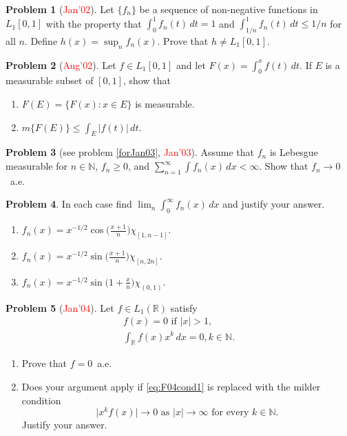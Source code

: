 \documentclass[12pt,reqno]{amsart}
\def\field#1{\mathbb{#1}}
\def\abs#1{\lvert {#1} \rvert}
\def\redc#1{[\textcolor{red}{#1}]}
\theoremstyle{definition}
\newtheorem{problem}{Problem}
\theoremstyle{remark}
\begin{document}
\begin{problem}\redc{Jan'02}
  Let $\{ f_n \}$ be a sequence of non-negative functions in
  $L_1[0,1]$ with the property that $\int_0^1 f_n(t)\, dt = 1$ and
  $\int_{1/n}^1 f_n(t)\, dt \leq 1/n$ for all $n$.  Define $h(x) =
  \sup_n f_n(x)$.  Prove that $ h \neq L_1[0,1]$.
\end{problem}
\begin{problem}\redc{Aug'02}
  Let $f \in L_1[0,1]$ and let $F(x) = \int_0^x f(t)\, dt$.  If $E$ is
  a measurable subset of $[0,1]$, show that
  \begin{enumerate}
  \item $F(E) = \{ F(x) : x \in E\}$ is measurable.
  \item $m\{ F(E) \} \leq \displaystyle{\int_E \abs{f(t)}\, dt}$.
  \end{enumerate}
\end{problem}
\begin{problem}[see problem \ref{forJan03}, \textcolor{red}{Jan'03}]
  Assume that $f_n$ is Lebesgue measurable for $n \in \field{N}$, $f_n
  \geq 0$, and $\sum_{n=1}^\infty \int f_n(x)\, dx < \infty$.  Show
  that $f_n \to 0$~a.e.
\end{problem}
\begin{problem}
  In each case find $\lim_n \int_0^\infty f_n(x)\, dx$ and justify
  your answer.
  \begin{enumerate}
  \item $f_n(x) = x^{-1/2} \cos\big( \frac{x+1}{n} \big)
    \chi_{[1,n-1]}$.
  \item $f_n(x) = x^{-1/2} \sin \big( \frac{x+1}{n} \big)
    \chi_{[n,2n]}$.
  \item $f_n(x) = x^{-1/2} \sin\big( 1 + \frac{x}{n} \big)
    \chi_{(0,1)}$.
  \end{enumerate}
\end{problem}
\begin{problem}\redc{Jan'04}
  Let $f \in L_1(\field{R})$ satisfy
  \begin{gather}
    f(x) = 0 \text{ if } \abs{x} > 1,\label{eq:F04cond1} \\
    \int_{\field{R}} f(x) x^k\, dx = 0, k\in \field{N}.
  \end{gather}
  \begin{enumerate}
  \item Prove that $f=0$~a.e.
  \item Does your argument apply if \eqref{eq:F04cond1} is replaced
    with the milder condition
    \begin{equation}\label{eq:F04cond1'}
        \abs{x^k f(x)} \to 0 \text{ as } \abs{x} \to \infty \text{ for
        every } k \in \field{N}.
    \end{equation}
    Justify your answer.
  \end{enumerate}
\end{problem}
\end{document}
